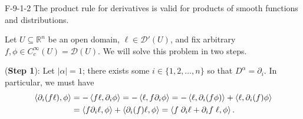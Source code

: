 \documentclass{article}
\begin{document}
	\begin{prb}{F-9-1-2}
		The product rule for derivatives is valid for products of smooth functions and distributions. 
	\end{prb}
	Let $U \subseteq \mathbb{R}^{n}$ be an open domain, $\ell \in \mathcal{D}'(U)$, and fix arbitrary $f, \phi \in C_{c}^{\infty}(U) = \mathcal{D}(U)$. We will solve this problem in two steps. 
	
	(\textbf{Step 1}): Let $|\alpha| = 1$; there exists some $i \in \{1, 2, \ldots, n\}$ so that $D^{\alpha} = \partial_{i}$. In particular, we must have 
	\begin{align*}
		\begin{split}
			\braket{\partial_{i}(f\ell), \phi} &= -\braket{f\ell, \partial_{i}\phi} = -\braket{\ell, f\partial_{i}\phi} = -\braket{\ell, \partial_{i}(f\phi)} + \braket{\ell, \partial_{i}(f)\phi} \\
			&= \braket{f\partial_{i}\ell, \phi} + \braket{\partial_{i}(f)\ell, \phi} = \braket{f\;\partial_{i}\ell + \partial_{i}f\;\ell, \phi}. 
		\end{split}
	\end{align*}
	
\end{document}
